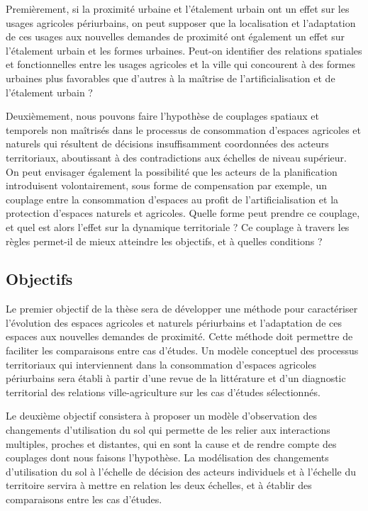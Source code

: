 Premièrement, si la proximité urbaine
et l'étalement urbain ont un effet sur les usages agricoles
périurbains, on peut supposer que la localisation et l'adaptation de ces usages
aux nouvelles demandes de proximité
ont également un effet sur l'étalement urbain et les formes urbaines.
Peut-on identifier des relations spatiales et fonctionnelles entre les usages agricoles
et la ville qui concourent à des formes urbaines
plus favorables que d'autres à la maîtrise de l'artificialisation
et de l'étalement urbain ?

Deuxièmement, nous pouvons faire l'hypothèse de couplages spatiaux et temporels
non maîtrisés dans le processus de consommation d'espaces agricoles et naturels
qui résultent de décisions insuffisamment coordonnées des acteurs territoriaux,
aboutissant à des contradictions aux échelles de niveau supérieur.
On peut envisager également la possibilité que les acteurs de la planification
introduisent volontairement, sous forme de compensation par exemple, un couplage
entre la consommation d'espaces au profit de l'artificialisation
et la protection d'espaces naturels et agricoles.
Quelle forme peut prendre ce couplage, et quel est alors
l'effet sur la dynamique territoriale ? Ce couplage
à travers les règles permet-il de mieux atteindre les objectifs, et à quelles conditions ?

\subsection{Objectifs}

Le premier objectif de la thèse sera de développer une méthode pour caractériser
l'évolution des espaces agricoles et naturels périurbains et l'adaptation
de ces espaces aux nouvelles demandes de proximité.
Cette méthode doit permettre de faciliter les comparaisons entre cas d'études.
Un modèle conceptuel des processus territoriaux
qui interviennent dans la consommation d'espaces agricoles périurbains
sera établi à partir d'une revue de la littérature
et d'un diagnostic territorial des relations ville-agriculture
sur les cas d'études sélectionnés.

Le deuxième objectif consistera à proposer un modèle d'observation des changements 
d'utilisation du sol qui permette de les relier aux interactions multiples, proches et distantes,
qui en sont la cause et de rendre compte des couplages
dont nous faisons l'hypothèse.
La modélisation des changements d'utilisation du sol
à l'échelle de décision des acteurs individuels
et à l'échelle du territoire servira à mettre en relation les deux échelles,
et à établir des comparaisons entre les cas d'études.

